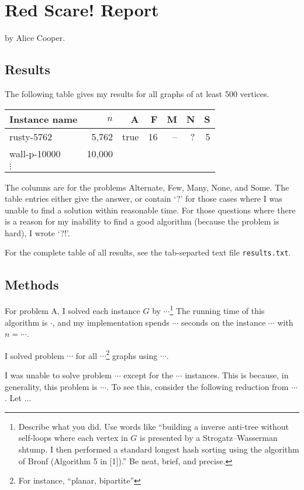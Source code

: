 \documentclass{tufte-handout}
\begin{document}
\section{Red Scare! Report}

by Alice Cooper.

\subsection{Results}

The following table gives my results for all graphs of at least 500 vertices.

\medskip
\begin{tabular}{lrrrrrr}
  \toprule
  Instance name & $n$ & A & F & M & N & S \\
  \midrule
  rusty-5762 & 5,762 & true & 16 & -- & ? & 5 \\
  wall-p-10000 & 10,000 &\\	
  $\vdots$\\
  \bottomrule
\end{tabular}
\medskip

The columns are for the problems Alternate, Few, Many, None, and Some.
The table entries either give the answer, or contain `?' for those cases where I was unable to find a solution within reasonable time.
For those questions where there is a reason for my inability to find a good algorithm (because the problem is hard), I wrote `?!'.

For the complete table of all results, see the tab-separted text file {\tt results.txt}.

\subsection{Methods}

For problem A, I solved each instance $G$ by $\cdots$\footnote{Describe what you did.
  Use words like ``building a inverse anti-tree without self-loops where each vertex in $G$ is presented by a Strogatz--Wasserman shtump.
  I then performed a standard longest hash sorting using the algorithm of Bronf (Algorithm 5 in [1]).''
  Be neat, brief, and precise.}
The running time of this algorithm is $\cdot$, and my implementation spends $\cdots$ seconds on the instance $\cdots$ with  $n=\cdots$.

I solved problem $\cdots$ for all $\cdots$\footnote{For instance, “planar, bipartite”} graphs using $\cdots$.

I was unable to solve problem $\cdots$ except for the $\cdots$ instances.
This is because, in generality, this problem is $\cdots$. 
To see this, consider the following reduction from $\cdots$.
Let $\ldots$ 
\end{document}
